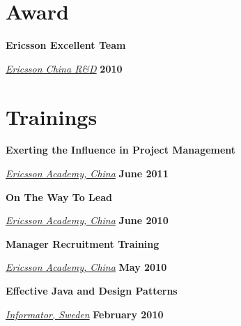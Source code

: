 
\section{Award}
\textbf{Ericsson Excellent Team}
\begin{outerlist}
\item[] \href{http://www.ericsson.com/}{\textit{Ericsson China R\&D}}
        \hfill \textbf{2010}
\end{outerlist}


\section{Trainings}
\textbf{Exerting the Influence in Project Management}
\begin{outerlist}
\item[] \href{http://www.ericssonacademy.com/}{\textit{Ericsson Academy, China}}
        \hfill \textbf{June 2011}
\end{outerlist}
\blankline

\textbf{On The Way To Lead}
\begin{outerlist}
\item[] \href{http://www.ericssonacademy.com/}{\textit{Ericsson Academy, China}}
        \hfill \textbf{June 2010}
\end{outerlist}
\blankline

\textbf{Manager Recruitment Training}
\begin{outerlist}
\item[] \href{http://www.ericssonacademy.com/}{\textit{Ericsson Academy, China}}
        \hfill \textbf{May 2010}
\end{outerlist}
\blankline

\textbf{Effective Java and Design Patterns}
\begin{outerlist}
\item[] \href{http://www.informator.se/}{\textit{Informator, Sweden}}
        \hfill \textbf{February 2010}
\end{outerlist}

